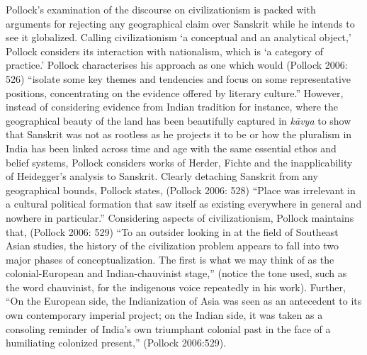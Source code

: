 Pollock’s examination of the discourse on civilizationism is packed with arguments for rejecting any geographical claim over Sanskrit while he intends to see it globalized. Calling civilizationism ‘a conceptual and an analytical object,’ Pollock considers its interaction with nationalism, which is ‘a category of practice.’ Pollock characterises his approach as one which would (Pollock 2006: 526) “isolate some key themes and tendencies and focus on some representative positions, concentrating on the evidence offered by literary culture.” However, instead of considering evidence from Indian tradition for instance, where the geographical beauty of the land has been beautifully captured in \textit{kāvya} to show that Sanskrit was not as rootless as he projects it to be or how the pluralism in India has been linked across time and age with the same essential ethos and belief systems, Pollock considers works of Herder, Fichte and the inapplicability of Heidegger’s analysis to Sanskrit. Clearly detaching Sanskrit from any geographical bounds, Pollock states, (Pollock 2006: 528) “Place was irrelevant in a cultural political formation that saw itself as existing everywhere in general and nowhere in particular.” Considering aspects of civilizationism, Pollock maintains that, (Pollock 2006: 529) “To an outsider looking in at the field of Southeast Asian studies, the history of the civilization problem appears to fall into two major phases of conceptualization. The first is what we may think of as the colonial-European and Indian-chauvinist stage,” (notice the tone used, such as the word chauvinist, for the indigenous voice repeatedly in his work). Further, “On the European side, the Indianization of Asia was seen as an antecedent to its own contemporary imperial project; on the Indian side, it was taken as a consoling reminder of India’s own triumphant colonial past in the face of a humiliating colonized present,” (Pollock 2006:529).

